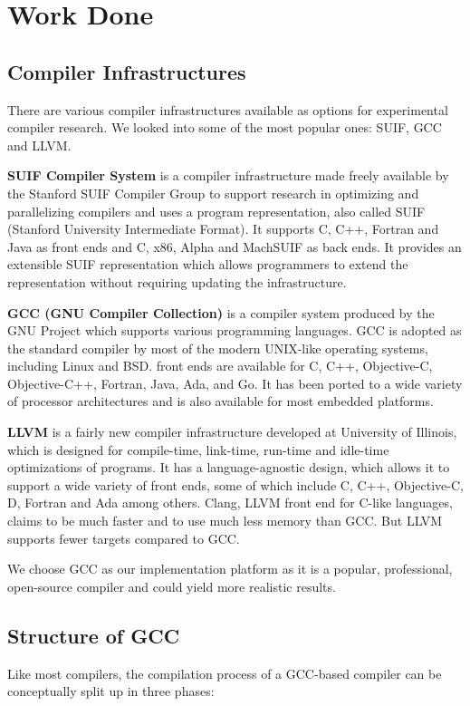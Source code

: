 \chapter{Work Done}

\section{Compiler Infrastructures}
There are various compiler infrastructures available as options for experimental compiler research. We looked into some of the most popular ones: SUIF, GCC and LLVM.

\textbf{SUIF Compiler System}\cite{suif} is a compiler infrastructure made freely available by the Stanford SUIF Compiler Group to support research in optimizing and parallelizing compilers and uses a program representation, also called SUIF (Stanford University Intermediate Format). It supports C, C++, Fortran and Java as front ends and C, x86, Alpha and MachSUIF as back ends. It provides an extensible SUIF representation which allows programmers to extend the representation without requiring updating the infrastructure.

\textbf{GCC (GNU Compiler Collection)}\cite{gcc} is a compiler system produced by the GNU Project which supports various programming languages. GCC is adopted as the standard compiler by most of the modern UNIX-like operating systems, including Linux and BSD. front ends are available for C, C++, Objective-C, Objective-C++, Fortran, Java, Ada, and Go. It has been ported to a wide variety of processor architectures and is also available for most embedded platforms.

\textbf{LLVM}\cite{llvm} is a fairly new compiler infrastructure developed at University of Illinois, which is designed for compile-time, link-time, run-time and idle-time optimizations of programs. It has a language-agnostic design, which allows it to support a wide variety of front ends, some of which include C, C++, Objective-C, D, Fortran and Ada among others. Clang, LLVM front end for C-like languages, claims to be much faster and to use much less memory than GCC\cite{clang}. But LLVM supports fewer targets compared to GCC.

We choose GCC as our implementation platform as it is a popular, professional, open-source compiler and could yield more realistic results.

\section{Structure of GCC}
Like most compilers, the compilation process of a GCC-based compiler can be conceptually split up in three phases\cite{gcc-structure}:

